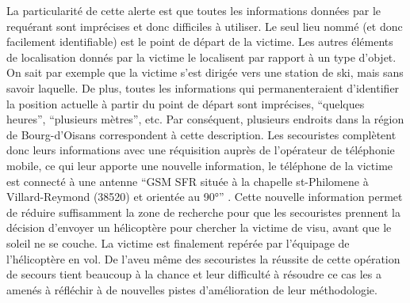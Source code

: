 La particularité de cette alerte est que toutes les informations
données par le requérant sont imprécises et donc difficiles à
utiliser. Le seul lieu nommé (et donc facilement identifiable) est le
point de départ de la victime. Les autres éléments de localisation
donnés par la victime le localisent par rapport à un type d'objet. On
sait par exemple que la victime s'est dirigée vers une station de ski,
mais sans savoir laquelle. De plus, toutes les informations qui
permanenteraient d'identifier la position actuelle à partir du point
de départ sont imprécises, \enquote{quelques heures},
\enquote{plusieurs mètres}, etc. Par conséquent, plusieurs endroits
dans la région de Bourg-d'Oisans correspondent à cette
description. Les secouristes complètent donc leurs informations avec
une réquisition auprès de l'opérateur de téléphonie mobile, ce qui
leur apporte une nouvelle information, le téléphone de la victime est
connecté à une antenne \enquote{GSM SFR située à la chapelle
  st-Philomene à Villard-Reymond (\num{38520}) et orientée au 90°}
\autocite{Lot 0.4}. Cette nouvelle information permet de réduire
suffisamment la zone de recherche pour que les secouristes prennent la
décision d'envoyer un hélicoptère pour chercher la victime de visu,
avant que le soleil ne se couche.
La victime est finalement repérée par l'équipage de l'hélicoptère en
vol. De l'aveu même des secouristes la réussite de cette opération de
secours tient beaucoup à la chance et leur difficulté à résoudre ce
cas les a amenés à réfléchir à de nouvelles pistes d'amélioration de
leur méthodologie.

